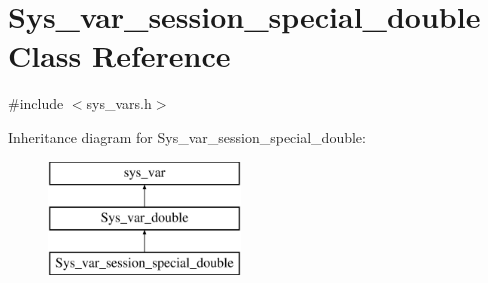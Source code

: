 \hypertarget{classSys__var__session__special__double}{}\section{Sys\+\_\+var\+\_\+session\+\_\+special\+\_\+double Class Reference}
\label{classSys__var__session__special__double}


{\ttfamily \#include $<$sys\+\_\+vars.\+h$>$}

Inheritance diagram for Sys\+\_\+var\+\_\+session\+\_\+special\+\_\+double\+:\begin{figure}[H]
\begin{center}
\leavevmode
\includegraphics[height=3.000000cm]{classSys__var__session__special__double}
\end{center}
\end{figure}
